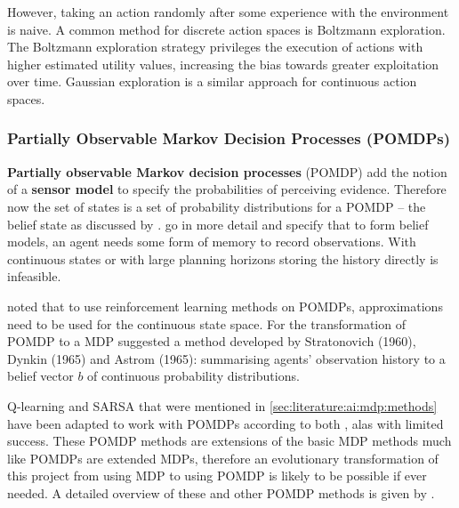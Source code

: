 However, taking an action randomly after some experience with the environment
is naive. A common method for discrete action spaces is Boltzmann exploration.
The Boltzmann exploration strategy privileges the execution of actions with
higher estimated utility values, increasing the bias towards greater
exploitation over time. Gaussian exploration is a similar approach for
continuous action spaces. \parencite{Hasselt2012ai+continuous}


\subsubsection{Partially Observable Markov Decision Processes (POMDPs)}
\label{sec:literature:ai:pomdp}

\textbf{Partially observable Markov decision processes} (POMDP) add the notion
of a \textbf{sensor model} to specify the probabilities of perceiving evidence.
Therefore now the set of states is a set of probability distributions for a
POMDP -- the belief state as discussed by \textcite{Russell2010ai+modern}.
\textcite{Spaan2012ai+pomdp} go in more detail and specify that to form belief
models, an agent needs some form of memory to record observations. With
continuous states or with large planning horizons storing the history directly
is infeasible.

\textcite{Russell2010ai+modern} noted that to use reinforcement learning
methods on POMDPs, approximations need to be used for the continuous state
space. For the transformation of POMDP to a MDP \textcite{Spaan2012ai+pomdp}
suggested a method developed by Stratonovich (1960), Dynkin (1965) and Astrom
(1965): summarising agents' observation history to a belief vector \(b\) of
continuous probability distributions.

Q-learning and SARSA that were mentioned in \ref{sec:literature:ai:mdp:methods}
have been adapted to work with POMDPs according to both
\textcite{Russell2010ai+modern, Spaan2012ai+pomdp}, alas with limited success.
These POMDP methods are extensions of the basic MDP methods much like POMDPs
are extended MDPs, therefore an evolutionary transformation of this project
from using MDP to using POMDP is likely to be possible if ever needed. A
detailed overview of these and other POMDP methods is given by
\textcite{Spaan2012ai+pomdp}.
